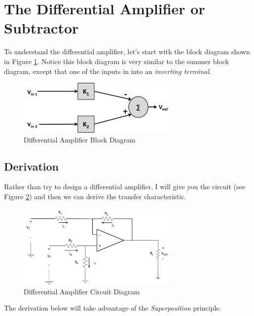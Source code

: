 \documentclass{handout}
\begin{document}
\section{The Differential Amplifier or Subtractor}
To understand the differential amplifier, let's start with the block diagram shown in Figure \ref{fig: DifferentialAmplifier}.  Notice this block diagram is very similar to the summer block diagram, except that one of the inputs in into an {\em inverting terminal}.

\begin{figure} [h!]
\centering
\includegraphics[width=0.7\textwidth]{DifferentialAmplifier.jpg}
\caption{Differential Amplifier Block Diagram}
\label{fig: DifferentialAmplifier}
\end{figure}

\subsection{Derivation}
Rather than try to design a differential amplifier, I will give you the circuit (see Figure \ref{fig: DifferentialAmplifierCircuit}) and then we can derive the transfer characteristic.

\begin{figure} [h!]
\centering
\includegraphics[width=0.7\textwidth]{DifferentialAmplifierCircuit.jpg}
\caption{Differential Amplifier  Circuit Diagram}
\label{fig: DifferentialAmplifierCircuit}
\end{figure}

The derivation below will take advantage of the {\em Superposition} principle. 

\newpage
\clearpage
\pagebreak
\end{document}
